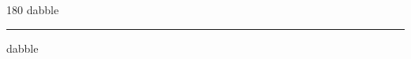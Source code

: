 
\begin{frame}
\begin{center}
\begin{turn}{180}
{\fontsize{2.5cm}{1em}\selectfont dabble}
\end{turn}
\vspace{1em}\par  
\hrule
\vspace{1em}\par  
{\fontsize{2.5cm}{1em}\selectfont dabble}
\end{center}
\end{frame}
